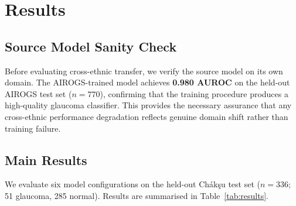 \documentclass[11pt,twocolumn]{article}
\begin{document}
\section{Results}
\label{sec:results}

\subsection{Source Model Sanity Check}
\label{sec:sanity}

Before evaluating cross-ethnic transfer, we verify the source model on its own domain. The AIROGS-trained model achieves \textbf{0.980 AUROC} on the held-out AIROGS test set ($n{=}770$), confirming that the training procedure produces a high-quality glaucoma classifier. This provides the necessary assurance that any cross-ethnic performance degradation reflects genuine domain shift rather than training failure.

\subsection{Main Results}
\label{sec:main_results}

We evaluate six model configurations on the held-out Ch\'{a}k\c{s}u test set ($n{=}336$; 51 glaucoma, 285 normal). Results are summarised in Table~\ref{tab:results}.
\end{document}
